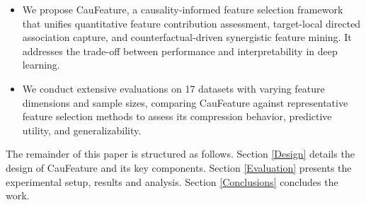 \documentclass[journal]{IEEEtran}
\begin{document}
\begin{itemize}
    \item We propose CauFeature, a causality-informed feature selection framework that unifies quantitative feature contribution assessment, target-local directed association capture, and counterfactual-driven synergistic feature mining. It addresses the trade-off between performance and interpretability in deep learning.
    \item We conduct extensive evaluations on 17 datasets with varying feature dimensions and sample sizes, comparing CauFeature against representative feature selection methods to assess its compression behavior, predictive utility, and generalizability.
    
\end{itemize}    

The remainder of this paper is structured as follows. Section \ref{Design} details the design of CauFeature and its key components. Section \ref{Evaluation} presents the experimental setup, results and analysis. Section \ref{Conclusions} concludes the work.






\end{document}
